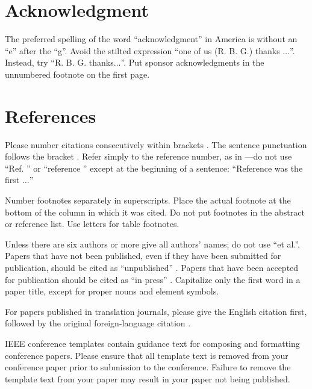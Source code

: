 \documentclass[conference]{IEEEtran}
\begin{document}
\section*{Acknowledgment}

The preferred spelling of the word ``acknowledgment'' in America is without 
an ``e'' after the ``g''. Avoid the stilted expression ``one of us (R. B. 
G.) thanks $\ldots$''. Instead, try ``R. B. G. thanks$\ldots$''. Put sponsor 
acknowledgments in the unnumbered footnote on the first page.

\section*{References}

Please number citations consecutively within brackets \cite{b1}. The 
sentence punctuation follows the bracket \cite{b2}. Refer simply to the reference 
number, as in \cite{b3}---do not use ``Ref. \cite{b3}'' or ``reference \cite{b3}'' except at 
the beginning of a sentence: ``Reference \cite{b3} was the first $\ldots$''

Number footnotes separately in superscripts. Place the actual footnote at 
the bottom of the column in which it was cited. Do not put footnotes in the 
abstract or reference list. Use letters for table footnotes.

Unless there are six authors or more give all authors' names; do not use 
``et al.''. Papers that have not been published, even if they have been 
submitted for publication, should be cited as ``unpublished'' \cite{b4}. Papers 
that have been accepted for publication should be cited as ``in press'' \cite{b5}. 
Capitalize only the first word in a paper title, except for proper nouns and 
element symbols.

For papers published in translation journals, please give the English 
citation first, followed by the original foreign-language citation \cite{b6}.




\vspace{12pt}
\color{red}
IEEE conference templates contain guidance text for composing and formatting conference papers. Please ensure that all template text is removed from your conference paper prior to submission to the conference. Failure to remove the template text from your paper may result in your paper not being published.
\end{document}
